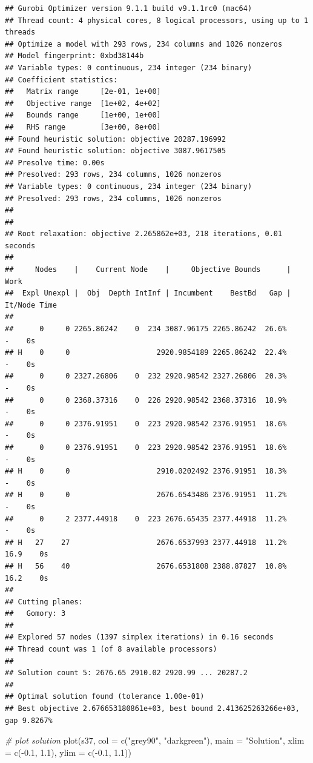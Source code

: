 \documentclass[
  12pt,
]{book}
\newenvironment{Shaded}{\begin{snugshade}}{\end{snugshade}}
\newcommand{\AttributeTok}[1]{\textcolor[rgb]{0.77,0.63,0.00}{#1}}
\newcommand{\CommentTok}[1]{\textcolor[rgb]{0.56,0.35,0.01}{\textit{#1}}}
\newcommand{\FloatTok}[1]{\textcolor[rgb]{0.00,0.00,0.81}{#1}}
\newcommand{\FunctionTok}[1]{\textcolor[rgb]{0.00,0.00,0.00}{#1}}
\newcommand{\NormalTok}[1]{#1}
\newcommand{\SpecialCharTok}[1]{\textcolor[rgb]{0.00,0.00,0.00}{#1}}
\newcommand{\StringTok}[1]{\textcolor[rgb]{0.31,0.60,0.02}{#1}}
\begin{document}
\begin{verbatim}
## Gurobi Optimizer version 9.1.1 build v9.1.1rc0 (mac64)
## Thread count: 4 physical cores, 8 logical processors, using up to 1 threads
## Optimize a model with 293 rows, 234 columns and 1026 nonzeros
## Model fingerprint: 0xbd38144b
## Variable types: 0 continuous, 234 integer (234 binary)
## Coefficient statistics:
##   Matrix range     [2e-01, 1e+00]
##   Objective range  [1e+02, 4e+02]
##   Bounds range     [1e+00, 1e+00]
##   RHS range        [3e+00, 8e+00]
## Found heuristic solution: objective 20287.196992
## Found heuristic solution: objective 3087.9617505
## Presolve time: 0.00s
## Presolved: 293 rows, 234 columns, 1026 nonzeros
## Variable types: 0 continuous, 234 integer (234 binary)
## Presolved: 293 rows, 234 columns, 1026 nonzeros
## 
## 
## Root relaxation: objective 2.265862e+03, 218 iterations, 0.01 seconds
## 
##     Nodes    |    Current Node    |     Objective Bounds      |     Work
##  Expl Unexpl |  Obj  Depth IntInf | Incumbent    BestBd   Gap | It/Node Time
## 
##      0     0 2265.86242    0  234 3087.96175 2265.86242  26.6%     -    0s
## H    0     0                    2920.9854189 2265.86242  22.4%     -    0s
##      0     0 2327.26806    0  232 2920.98542 2327.26806  20.3%     -    0s
##      0     0 2368.37316    0  226 2920.98542 2368.37316  18.9%     -    0s
##      0     0 2376.91951    0  223 2920.98542 2376.91951  18.6%     -    0s
##      0     0 2376.91951    0  223 2920.98542 2376.91951  18.6%     -    0s
## H    0     0                    2910.0202492 2376.91951  18.3%     -    0s
## H    0     0                    2676.6543486 2376.91951  11.2%     -    0s
##      0     2 2377.44918    0  223 2676.65435 2377.44918  11.2%     -    0s
## H   27    27                    2676.6537993 2377.44918  11.2%  16.9    0s
## H   56    40                    2676.6531808 2388.87827  10.8%  16.2    0s
## 
## Cutting planes:
##   Gomory: 3
## 
## Explored 57 nodes (1397 simplex iterations) in 0.16 seconds
## Thread count was 1 (of 8 available processors)
## 
## Solution count 5: 2676.65 2910.02 2920.99 ... 20287.2
## 
## Optimal solution found (tolerance 1.00e-01)
## Best objective 2.676653180861e+03, best bound 2.413625263266e+03, gap 9.8267%
\end{verbatim}

\begin{Shaded}
\begin{Highlighting}[]
\CommentTok{\# plot solution}
\FunctionTok{plot}\NormalTok{(s37, }\AttributeTok{col =} \FunctionTok{c}\NormalTok{(}\StringTok{"grey90"}\NormalTok{, }\StringTok{"darkgreen"}\NormalTok{), }\AttributeTok{main =} \StringTok{"Solution"}\NormalTok{,}
     \AttributeTok{xlim =} \FunctionTok{c}\NormalTok{(}\SpecialCharTok{{-}}\FloatTok{0.1}\NormalTok{, }\FloatTok{1.1}\NormalTok{), }\AttributeTok{ylim =} \FunctionTok{c}\NormalTok{(}\SpecialCharTok{{-}}\FloatTok{0.1}\NormalTok{, }\FloatTok{1.1}\NormalTok{))}
\end{Highlighting}
\end{Shaded}
\end{document}
